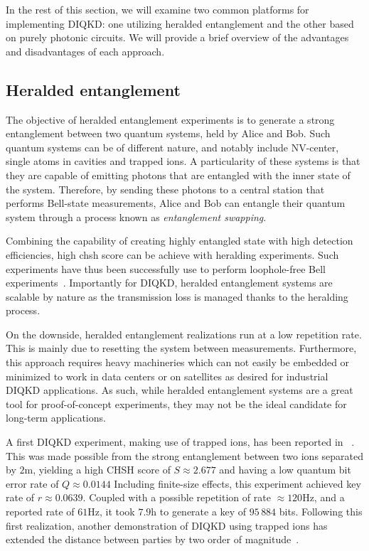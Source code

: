\medbreak

In the rest of this section, we will examine two common platforms for implementing DIQKD: one utilizing heralded entanglement and the other based on purely photonic circuits. 
We will provide a brief overview of the advantages and disadvantages of each approach.

\subsection{Heralded entanglement}

The objective of heralded entanglement experiments is to generate a strong entanglement between two quantum systems, held by Alice and Bob.
Such quantum systems can be of different nature, and notably include NV-center, single atoms in cavities and trapped ions.
A particularity of these systems is that they are capable of emitting photons that are entangled with the inner state of the system.
Therefore, by sending these photons to a central station that performs Bell-state measurements, Alice and Bob can entangle their quantum system through a process known as \textit{entanglement swapping}.

Combining the capability of creating highly entangled state with high detection efficiencies, high \acrshort{chsh} score can be achieve with heralding experiments. 
Such experiments have thus been successfully use to perform loophole-free Bell experiments~\cite{Hensen2015,Rosenfeld2017}.
Importantly for DIQKD, heralded entanglement systems are scalable by nature as the transmission loss is managed thanks to the heralding process.

On the downside, heralded entanglement realizations run at a low repetition rate. 
This is mainly due to resetting the system between measurements.
Furthermore, this approach requires heavy machineries which can not easily be embedded or minimized to work in data centers or on satellites as desired for industrial DIQKD applications.
As such, while heralded entanglement systems are a great tool for proof-of-concept experiments, they may not be the ideal candidate for long-term applications.

\medbreak

A first DIQKD experiment, making use of trapped ions, has been reported in ~\cite{Nadlinger2022}.
This was made possible from the strong entanglement between two ions separated by $2\mathrm{m}$, yielding a high CHSH score of $S\approx 2.677$ and having a low quantum bit error rate of $Q\approx 0.0144$
Including finite-size effects, this experiment achieved key rate of $r \approx 0.0639$.
Coupled with a possible repetition of rate $\approx120\mathrm{Hz}$, and a reported rate of $61\mathrm{Hz}$, it took $7.9\mathrm{h}$ to generate a key of $95\,884$ bits.
Following this first realization, another demonstration of DIQKD using trapped ions has extended the distance between parties by two order of magnitude~\cite{Zhang2022}.

